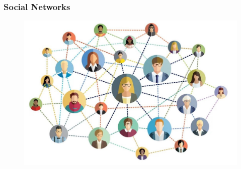 \documentclass[8pt]{beamer}
\begin{document}
  \begin{frame}
  	\frametitle{Social Networks}
  	\begin{figure}
  		\includegraphics[scale=0.25]{asset/social-network.jpeg}
  	\end{figure}
  \end{frame}
  
\end{document}
